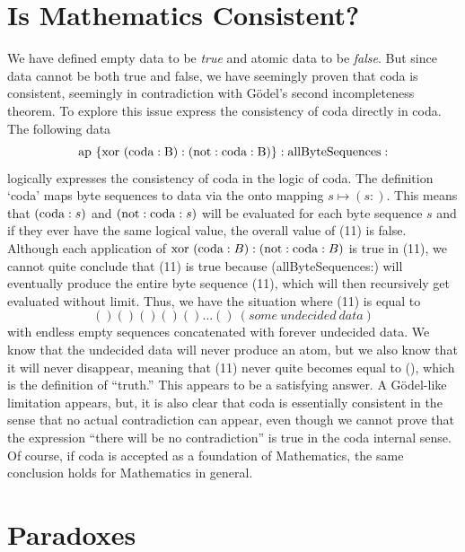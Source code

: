 \documentclass[11pt]{article}
\begin{document}
\section{Is Mathematics Consistent?}

     We have defined empty data to be {\it true} and atomic data to be {\it false}.  But since data 
cannot be both true and false, we have seemingly proven that coda is consistent, seemingly 
in contradiction with G\"{o}del's second incompleteness theorem.  To explore this issue  
express the consistency of coda directly in coda.  The following data 
\begin{equation}\label{eqn}
{\rm ap\ \{xor\ (coda:B) : (not:coda:B) \} : allByteSequences :} 
\end{equation}
logically expresses the consistency of coda in the logic of coda.  The definition `coda' maps 
byte sequences to data via the onto mapping $s\mapsto (s:)$.  This means that $({\rm coda}:s)$ and 
$({\rm not}:{\rm coda}:s)$ will be evaluated for each byte sequence $s$ and if they ever have the same logical 
value, the overall value of (11) is false.   Although each application of ${\rm xor}\ ({\rm coda}:B) : ({\rm not}:{\rm coda}:B)$ 
is true in (11), we cannot quite conclude that (11) is true because (allByteSequences:) will   
eventually produce the entire byte sequence (11), which will then recursively get evaluated 
without limit.  Thus, we have the situation where (11) is equal to 
\begin{equation}\label{eqn}
() () () () () \dots ()\  (some\ undecided\ data)
\end{equation}
with endless empty sequences concatenated with forever undecided data. 
We know that the undecided data will never produce an atom, but we also know that it will never disappear, 
meaning that (11) never quite becomes equal to (), which is the definition of ``truth.''  This appears 
to be a satisfying answer.  A G\"{o}del-like limitation appears, but, it is also clear that coda 
is essentially consistent in the sense that no actual contradiction can appear, even though we 
cannot prove that the expression ``there will be no contradiction'' is true in the coda internal sense.
Of course, if coda is accepted as a foundation of Mathematics, the same conclusion holds for Mathematics 
in general.  

\section{Paradoxes}
\end{document}
